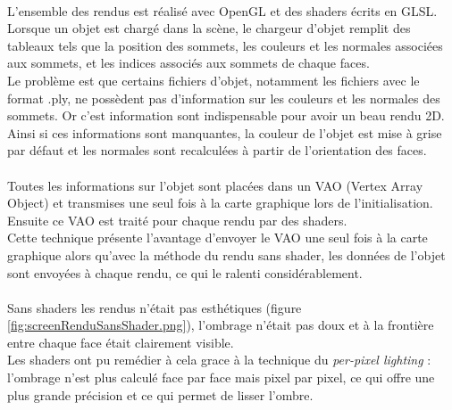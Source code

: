 \paragraph{}
L'ensemble des rendus est réalisé avec OpenGL et des shaders écrits en GLSL. Lorsque un objet est chargé dans la scène, le chargeur d'objet remplit des tableaux tels que la position des sommets, les couleurs et les normales associées aux sommets, et les indices associés aux sommets de chaque faces.\\
Le problème est que certains fichiers d'objet, notamment les fichiers avec le format .ply, ne possèdent pas d'information sur les couleurs et les normales des sommets. Or c'est information sont indispensable pour avoir un beau rendu 2D. Ainsi si ces informations sont manquantes, la couleur de l'objet est mise à grise par défaut et les normales sont recalculées à partir de l'orientation des faces.

\paragraph{}
Toutes les informations sur l'objet sont placées dans un VAO (Vertex Array Object) et transmises une seul fois à la carte graphique lors de l'initialisation. Ensuite ce VAO est traité pour chaque rendu par des shaders.\\
Cette technique présente l'avantage d'envoyer le VAO une seul fois à la carte graphique alors qu'avec la méthode du rendu sans shader, les données de l'objet sont envoyées à chaque rendu, ce qui le ralenti considérablement.

\paragraph{}
Sans shaders les rendus n'était pas esthétiques (figure \ref{fig:screenRenduSansShader.png}), l'ombrage n'était pas doux et à la frontière entre chaque face était clairement visible.\\
Les shaders ont pu remédier à cela grace à la technique du \textit{per-pixel lighting} : l'ombrage n'est plus calculé face par face mais pixel par pixel, ce qui offre une plus grande précision et ce qui permet de lisser l'ombre.\\

